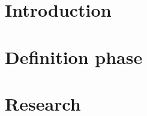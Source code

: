 \documentclass{report}
\begin{document}



\tableofcontents
\newpage

\chapter{Introduction}

\newpage

\chapter{Definition phase}


\newpage
\chapter{Research}


\newpage
\printbibliography

\newpage

\end{document}
